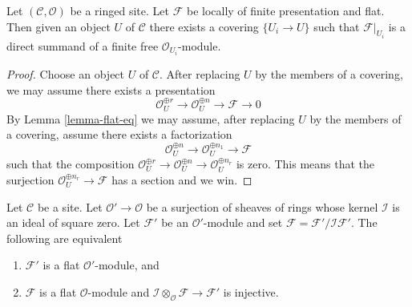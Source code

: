 \begin{lemma}
\label{lemma-flat-locally-finite-presentation}
Let $(\mathcal{C}, \mathcal{O})$ be a ringed site. Let $\mathcal{F}$
be locally of finite presentation and flat. Then given an object
$U$ of $\mathcal{C}$ there exists a covering $\{U_i \to U\}$ such that
$\mathcal{F}|_{U_i}$ is a direct summand of a finite free
$\mathcal{O}_{U_i}$-module.
\end{lemma}

\begin{proof}
Choose an object $U$ of $\mathcal{C}$.
After replacing $U$ by the members of a covering, we may
assume there exists a presentation
$$
\mathcal{O}_U^{\oplus r} \to
\mathcal{O}_U^{\oplus n} \to \mathcal{F} \to 0
$$
By Lemma \ref{lemma-flat-eq} we may assume, after replacing $U$
by the members of a covering, assume there exists a factorization
$$
\mathcal{O}_U^{\oplus n} \to
\mathcal{O}_U^{\oplus n_1} \to \mathcal{F}
$$
such that the composition
$\mathcal{O}_U^{\oplus r} \to \mathcal{O}_U^{\oplus n}
\to \mathcal{O}_U^{\oplus n_r}$ is zero.
This means that the surjection $\mathcal{O}_U^{\oplus n_r} \to \mathcal{F}$
has a section and we win.
\end{proof}

\begin{lemma}
\label{lemma-flat-over-thickening}
Let $\mathcal{C}$ be a site. Let $\mathcal{O}' \to \mathcal{O}$
be a surjection of sheaves of rings whose kernel $\mathcal{I}$ is
an ideal of square zero. Let $\mathcal{F}'$ be an $\mathcal{O}'$-module
and set $\mathcal{F} = \mathcal{F}'/\mathcal{I}\mathcal{F}'$.
The following are equivalent
\begin{enumerate}
\item $\mathcal{F}'$ is a flat $\mathcal{O}'$-module, and
\item $\mathcal{F}$ is a flat $\mathcal{O}$-module and
$\mathcal{I} \otimes_\mathcal{O} \mathcal{F} \to \mathcal{F}'$
is injective.
\end{enumerate}
\end{lemma}

